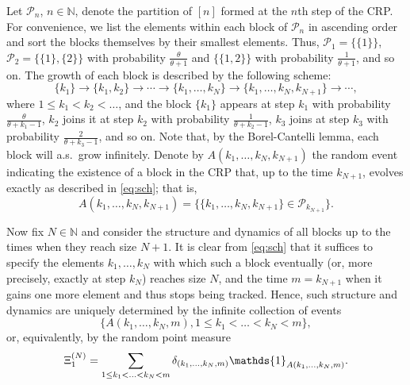 \documentclass[11pt]{article}
\newcommand{\N}{\mathbb{N}}
\newcommand{\1}[1][]{
	\ifx&#1&\mathds{1}
	\else\mathds{1}\left\{#1\right\}\fi}
\newcommand{\Pc}{\mathcal{P}}
\theoremstyle{definition}
\theoremstyle{remark}
\numberwithin{equation}{section}
\begin{document}
	Let $\Pc_n$, $n\in\N$, denote the partition of $[n]$ formed at the $n$th step of the CRP. 
	For convenience, we list the elements within each block of $\Pc_n$ in ascending order and sort the blocks themselves by their smallest elements.
	Thus, $\Pc_1=\{\{1\}\}$, $\Pc_2=\{\{1\},\{2\}\}$ with probability $\frac{\theta}{\theta+1}$ and $\{\{1,2\}\}$
	with probability $\frac{1}{\theta+1}$, and so on. The growth of each block is described by the following scheme:
	\begin{equation}
		\label{eq:sch}
		\{k_1\} \longrightarrow \{k_1,k_2\} \longrightarrow \cdots
		\longrightarrow \{k_1,\ldots,k_N\} \longrightarrow
		\{k_1,\ldots,k_N,k_{N+1}\} \longrightarrow \cdots,
	\end{equation}
	where $1\le k_1<k_2<\ldots$, and the block $\{k_1\}$ appears at step $k_1$ with probability $\frac{\theta}{\theta+k_1-1}$,
	$k_2$ joins it at step $k_2$ with probability $\frac{1}{\theta+k_2-1}$, $k_3$ joins at step $k_3$ with probability
	$\frac{2}{\theta+k_3-1}$, and so on. Note that, by the Borel-Cantelli lemma, each block will a.s.~grow infinitely.
	Denote by $A(k_1,\ldots,k_N,k_{N+1})$ the random event indicating the existence of a block in the CRP that,
	up to the time $k_{N+1}$, evolves exactly as described in \eqref{eq:sch}; that is,
	\begin{equation}
		\label{eq:A}
		A(k_1,\ldots,k_N,k_{N+1}) = \bigl\{\{k_1,\ldots,k_N,k_{N+1}\}
		\in \Pc_{k_{N+1}}\bigr\}.
	\end{equation}
	
	Now fix $N\in\N$ and consider the structure and dynamics of all blocks up to the times when they reach size $N+1$.
	It is clear from \eqref{eq:sch} that it suffices to specify the elements $k_1,\ldots,k_N$ with which such a block
	eventually (or, more precisely, exactly at step $k_N$) reaches size $N$, and the time $m=k_{N+1}$
	when it gains one more element and thus stops being tracked.
	Hence, such structure and dynamics are uniquely determined by the infinite collection of events
	\begin{equation*}
		\{A(k_1,\ldots,k_N,m),1\le k_1<\ldots<k_N<m\},
	\end{equation*}
	or, equivalently, by the random point measure
	\begin{equation}
		\label{eq:Xi1}
		\Xi_1^{(N)} =
		\sum_{1\le k_1 < \ldots < k_N < m} \delta_{(k_1,\ldots,k_N,m)}
		\1_{A(k_1,\ldots,k_N,m)}.
	\end{equation}
	
\end{document}
